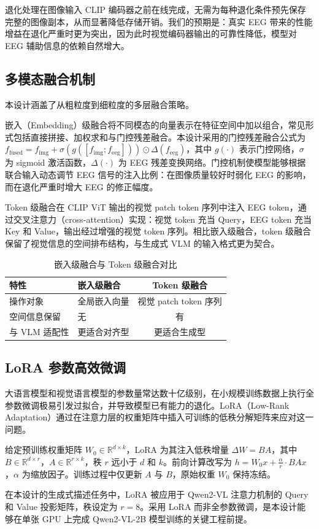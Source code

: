 退化处理在图像输入 CLIP 编码器之前在线完成，无需为每种退化条件预先保存完整的图像副本，从而显著降低存储开销。我们的预期是：真实 EEG 带来的性能增益在退化严重时更为突出，因为此时视觉编码器输出的可靠性降低，模型对 EEG 辅助信息的依赖自然增大。

\subsection{多模态融合机制}

本设计涵盖了从粗粒度到细粒度的多层融合策略。

嵌入（Embedding）级融合将不同模态的向量表示在特征空间中加以组合，常见形式包括直接拼接、加权求和与门控残差融合。本设计采用的门控残差融合公式为 $f_{\mathrm{fused}} = f_{\mathrm{img}} + \sigma(g([f_{\mathrm{img}}; f_{\mathrm{eeg}}])) \odot \Delta(f_{\mathrm{eeg}})$，其中 $g(\cdot)$ 表示门控网络，$\sigma$ 为 sigmoid 激活函数，$\Delta(\cdot)$ 为 EEG 残差变换网络。门控机制使模型能够根据联合输入动态调节 EEG 信号的注入比例：在图像质量较好时弱化 EEG 的影响，而在退化严重时增大 EEG 的修正幅度。

Token 级融合在 CLIP ViT 输出的视觉 patch token 序列中注入 EEG token，通过交叉注意力（cross-attention）实现：视觉 token 充当 Query，EEG token 充当 Key 和 Value，输出经过增强的视觉 token 序列。相比嵌入级融合，token 级融合保留了视觉信息的空间排布结构，与生成式 VLM 的输入格式更为契合。

\begin{table}[h]
\centering
\caption{嵌入级融合与 Token 级融合对比}
\label{tab:fusion-comparison}
\begin{tabular}{llc}
\toprule
特性 & 嵌入级融合 & Token 级融合 \\
\midrule
操作对象 & 全局嵌入向量 & 视觉 patch token 序列 \\
空间信息保留 & 无 & 有 \\
与 VLM 适配性 & 更适合对齐型 & 更适合生成型 \\
\bottomrule
\end{tabular}
\end{table}

\subsection{LoRA 参数高效微调}

大语言模型和视觉语言模型的参数量常达数十亿级别，在小规模训练数据上执行全参数微调极易引发过拟合，并导致模型已有能力的退化。LoRA（Low-Rank Adaptation）通过在注意力层的权重矩阵中插入可训练的低秩分解矩阵来应对这一问题。

给定预训练权重矩阵 $W_0 \in \mathbb{R}^{d\times k}$，LoRA 为其注入低秩增量 $\Delta W = BA$，其中 $B \in \mathbb{R}^{d\times r}$，$A \in \mathbb{R}^{r\times k}$，秩 $r$ 远小于 $d$ 和 $k$。前向计算改写为 $h = W_0 x + \frac{\alpha}{r} \cdot BA x$，$\alpha$ 为缩放因子。训练过程中仅更新 $A$ 与 $B$，原始权重 $W_0$ 保持冻结。

在本设计的生成式描述任务中，LoRA 被应用于 Qwen2-VL 注意力机制的 Query 和 Value 投影矩阵，秩设定为 $r=8$。采用 LoRA 而非全参数微调，是本设计能够在单张 GPU 上完成 Qwen2-VL-2B 模型训练的关键工程前提。
